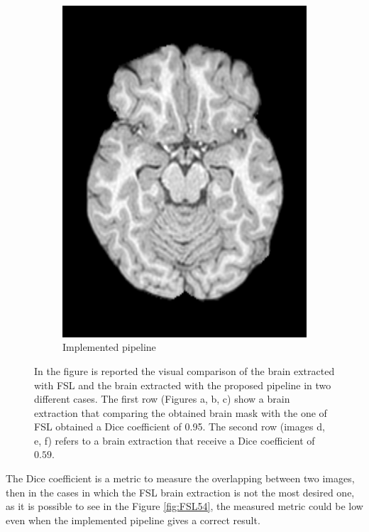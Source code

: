 \documentclass{standalone}
\begin{document}
\begin{figure}[h!]
\begin{subfigure}[b]{0.325\textwidth}
             \includegraphics[scale=0.122]{img/Chap3/BRAIN54.jpg}
             \caption{Implemented pipeline}
        \end{subfigure}
        \caption{In the figure is reported the visual comparison of the brain extracted with FSL and the brain extracted with the proposed pipeline in two different cases. 
        The first row (Figures a, b, c) show a brain extraction that comparing the obtained brain mask with the one of FSL obtained a Dice coefficient of 0.95.
        The second row (images d, e, f) refers to a brain extraction that receive a Dice coefficient of $ 0.59$.}\label{fig:FSL_brain}
\end{figure}

The Dice coefficient is a metric to measure the overlapping between two images, then in the cases in which the FSL brain extraction is not the most desired one, as it is possible to see in the Figure \ref{fig:FSL54}, the measured metric could be low even when the implemented pipeline gives a correct result.
\end{document}

